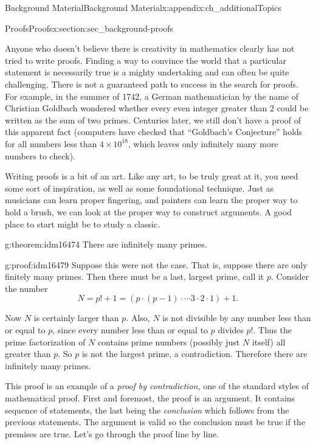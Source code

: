 \documentclass[oneside,10pt,]{book}
\numberwithin{equation}{chapter}
\begin{document}
\begin{appendixptx}{Background Material}{}{Background Material}{}{}{x:appendix:ch_additionalTopics}
\begin{sectionptx}{Proofs}{}{Proofs}{}{}{x:section:sec_background-proofs}
\begin{introduction}{}
Anyone who doesn't believe there is creativity in mathematics clearly has not tried to write proofs. Finding a way to convince the world that a particular statement is necessarily true is a mighty undertaking and can often be quite challenging. There is not a guaranteed path to success in the search for proofs. For example, in the summer of 1742, a German mathematician by the name of Christian Goldbach wondered whether every even integer greater than 2 could be written as the sum of two primes. Centuries later, we still don't have a proof of this apparent fact (computers have checked that ``Goldbach's Conjecture'' holds for all numbers less than \(4\times 10^{18}\), which leaves only infinitely many more numbers to check).%
\par
Writing proofs is a bit of an art. Like any art, to be truly great at it, you need some sort of inspiration, as well as some foundational technique. Just as musicians can learn proper fingering, and painters can learn the proper way to hold a brush, we can look at the proper way to construct arguments. A good place to start might be to study a classic.%
\begin{theorem}{}{}{g:theorem:idm16474}%
There are infinitely many primes.%
\end{theorem}
\begin{proofptx}{}{g:proof:idm16479}
Suppose this were not the case. That is, suppose there are only finitely many primes. Then there must be a last, largest prime, call it \(p\). Consider the number%
\begin{equation*}
N = p! + 1 = (p \cdot (p-1) \cdot \cdots 3\cdot 2 \cdot 1) + 1.
\end{equation*}
%
\par
Now \(N\) is certainly larger than \(p\). Also, \(N\) is not divisible by any number less than or equal to \(p\), since every number less than or equal to \(p\) divides \(p!\). Thus the prime factorization of \(N\) contains prime numbers (possibly just \(N\) itself) all greater than \(p\). So \(p\) is not the largest prime, a contradiction. Therefore there are infinitely many primes.%
\end{proofptx}
This proof is an example of a \emph{proof by contradiction}, one of the standard styles of mathematical proof. First and foremost, the proof is an argument. It contains sequence of statements, the last being the \emph{conclusion} which follows from the previous statements. The argument is valid so the conclusion must be true if the premises are true. Let's go through the proof line by line.%

\end{introduction}
\end{sectionptx}
\end{appendixptx}
\end{document}
